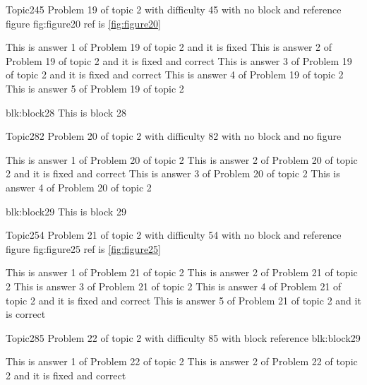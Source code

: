 \documentclass[master]{exam}
\begin{document}
\begin{problem}{Topic2}{45}
	Problem 19 of topic 2 with difficulty 45 with no block and reference figure fig:figure20 ref is \ref{fig:figure20}
	\begin{answers}
		\answer[fixed] This is answer 1 of Problem 19 of topic 2 and it is fixed
		 This is answer 2 of Problem 19 of topic 2 and it is fixed and correct
		 This is answer 3 of Problem 19 of topic 2 and it is fixed and correct
		\answer This is answer 4 of Problem 19 of topic 2 
		\answer This is answer 5 of Problem 19 of topic 2 
	\end{answers}
\end{problem}



\begin{block}{blk:block28}
This is block 28
\end{block}


\begin{problem}{Topic2}{82}
	Problem 20 of topic 2 with difficulty 82 with no block and no figure
	\begin{answers}
		\answer This is answer 1 of Problem 20 of topic 2 
		 This is answer 2 of Problem 20 of topic 2 and it is fixed and correct
		\answer This is answer 3 of Problem 20 of topic 2 
		\answer This is answer 4 of Problem 20 of topic 2 
	\end{answers}
\end{problem}



\begin{block}{blk:block29}
This is block 29
\end{block}


\begin{problem}{Topic2}{54}
	Problem 21 of topic 2 with difficulty 54 with no block and reference figure fig:figure25 ref is \ref{fig:figure25}
	\begin{answers}
		\answer This is answer 1 of Problem 21 of topic 2 
		\answer This is answer 2 of Problem 21 of topic 2 
		\answer This is answer 3 of Problem 21 of topic 2 
		 This is answer 4 of Problem 21 of topic 2 and it is fixed and correct
		\answer[correct] This is answer 5 of Problem 21 of topic 2 and it is correct
	\end{answers}
\end{problem}

\begin{problem}[requires=blk:block29]{Topic2}{85}
	Problem 22 of topic 2 with difficulty 85 with block reference blk:block29
	\begin{answers}
		\answer This is answer 1 of Problem 22 of topic 2 
		 This is answer 2 of Problem 22 of topic 2 and it is fixed and correct
	\end{answers}
\end{problem}
\end{document}
